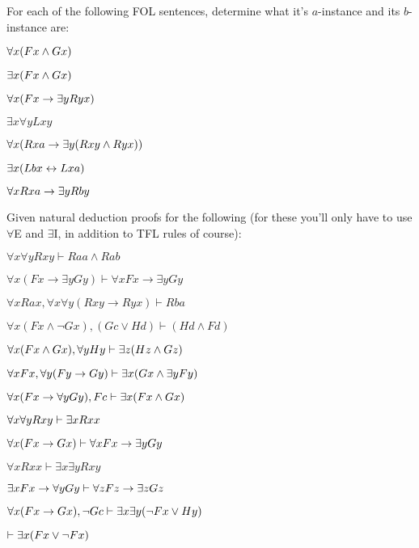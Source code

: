 \practiceproblems

\problempart For each of the following FOL sentences, determine what it's $a$-instance and its $b$-instance are:


\begin{earg}

\item $\forall x(Fx \wedge Gx)$

\item $\exists x(Fx \wedge Gx)$

\item $\forall x(Fx \rightarrow \exists yRyx)$

\item $\exists x \forall y Lxy$

\item $\forall x(Rxa \rightarrow \exists y(Rxy \wedge Ryx))$

\item $\exists x(Lbx \leftrightarrow Lxa)$

\item $\forall xRxa \rightarrow \exists yRby$



\end{earg}

\problempart Given natural deduction proofs for the following (for these you'll only have to use $\forall$E and $\exists$I, in addition to TFL rules of course):


\begin{earg}
\item $\forall x\forall y Rxy \vdash Raa \land Rab$
\item $\forall x(Fx \rightarrow \exists yGy) \vdash \forall x Fx \rightarrow \exists y Gy$
\item $\forall xRax, \forall x \forall y(Rxy \rightarrow Ryx) \vdash Rba$
\item $\forall x(Fx \land \lnot Gx), (Gc \lor Hd) \vdash (Hd \land Fd)$
\item $\forall x(Fx \wedge Gx), \forall yHy \vdash \exists z(Hz \wedge Gz)$
\item $\forall xFx, \forall y (Fy \rightarrow Gy) \vdash \exists x(Gx \wedge \exists yFy)$
\item $\forall x(Fx \rightarrow \forall yGy), Fc \vdash \exists x(Fx \wedge Gx)$
\item $\forall x \forall y Rxy \vdash \exists x Rxx$
\item $\forall x(Fx \rightarrow Gx) \vdash \forall xFx \rightarrow \exists yGy$
\item $\forall xRxx \vdash \exists x \exists y Rxy$
\item $\exists xFx \rightarrow \forall y Gy \vdash \forall z Fz \rightarrow \exists zGz$
\item $\forall x(Fx \rightarrow Gx), \neg Gc \vdash \exists x\exists y(\neg Fx \vee Hy)$
\item $\vdash \exists x(Fx \vee \neg Fx)$
\end{earg}




